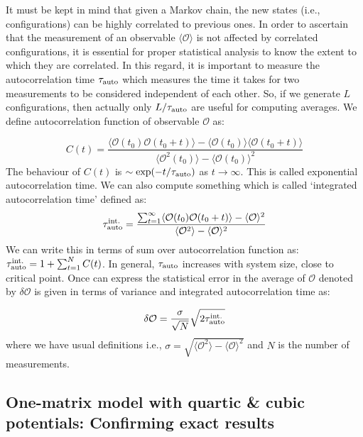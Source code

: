 \documentclass[11pt]{article}
\begin{document}
It must be kept in mind that given a Markov chain, the new states (i.e., configurations) can be highly correlated to previous ones. In order to ascertain that the measurement of an observable $\langle \mathcal{O} \rangle$ is not affected by correlated configurations, it is essential for proper statistical analysis to know the extent to which they are correlated. In this regard, it is important to measure
the autocorrelation time $ \tau_{\rm{auto}}$ which measures the time it takes for two measurements to be considered independent of each other. So, if we generate $L$ configurations, then actually only $L/\tau_{\rm{auto}}$ are useful for computing averages.
We define autocorrelation function of observable $\mathcal{O}$ as:
 
 \begin{equation}
 	C(t) = \frac{\langle \mathcal{O}(t_0) \mathcal{O}(t_0 + t) \rangle - \langle \mathcal{O}(t_0)\rangle \langle \mathcal{O}(t_0 + t) \rangle}{\langle \mathcal{O}^2(t_0)\rangle - \langle \mathcal{O}(t_0)\rangle^{2}}
 \end{equation}
The behaviour of $C(t)$ is $\sim \exp(-t/\tau_{\rm{auto}})$ as $ t \to \infty$. This is called exponential autocorrelation time. We can also compute something which is called `integrated autocorrelation time' defined as:
\begin{equation}
	\tau_{\rm{auto}}^{\rm{int.}} = \frac{\sum_{t=1}^{\infty} \langle \mathcal{O}(t_0) \mathcal{O}(t_0 + t) \rangle - \langle \mathcal{O} \rangle^2 }{\langle \mathcal{O}^2\rangle - \langle \mathcal{O}\rangle^{2}}
\end{equation}
We can write this in terms of sum over autocorrelation function as: $\tau_{\rm{auto}}^{\rm{int.}} = 1 + \sum_{t=1}^{N} C(t)$. In general, $ \tau_{\rm{auto}}$ increases with system size, close to critical point. Once can express the statistical error in the average of $\mathcal{O}$ denoted by $\delta \mathcal{O}$ is given in terms of variance and integrated autocorrelation time as:

\begin{equation}
	\delta \mathcal{O} = \frac{\sigma}{\sqrt{N}} \sqrt{2 \tau_{\rm{auto}}^{\rm{int.}}}
\end{equation}
where we have usual definitions i.e., 
$\sigma = \sqrt{\langle \mathcal{O}^2\rangle - \langle \mathcal{O}\rangle^{2}}$ and $N$ is the number of measurements. 




\subsection{One-matrix model with quartic \& cubic potentials: Confirming exact results} 
\end{document}
